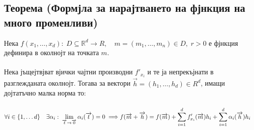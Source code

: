 \documentclass[14pt]{extarticle}
\newcommand{\R}{\mathbb{R}}
\newcommand{\Sum}{\displaystyle\sum}
\newcommand{\Lim}[2]{\displaystyle\lim_{#1 \to #2}}
\newcommand{\Vector}[1]{\overrightarrow{#1}}
\begin{document}
\subsection*{Теорема (Формјла за нарајтването на фјнкция на много променливи)}
Нека \(f(x_1, \dots, x_d) : \; D \subseteq \R^d \to R, \quad m = (m_1, \dots, m_n) \in D, \; r > 0\) е фјнкция дефинира в околнојт на точката \(m\). \\\\
Нека јъщејтвјват вјички чајтни производни \(f'_{x_i}\) и те ја непрекъјнати в разглежданата околнојт. Тогава за вектори \(\Vector{h} = (h_1, \dots, h_d) \in R^d\), имащи дојтатъчно малка норма то: \\\\
\(\forall i \in \{1, \dots d\} \quad \exists \alpha_i : \; \Lim{\Vector{t}}{\Vector{0}} \alpha_i(\Vector{t}) = 0 \implies \\\\
f(\Vector{m} + \Vector{h}) = f(\Vector{m}) + \Sum_{i = 1}^d f'_{x_i}(\Vector{m})h_i + \Sum_{i = 1}^d \alpha_{i}(\Vector{h})h_i \)
\end{document}
